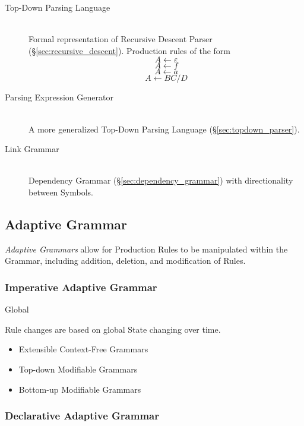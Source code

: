 \begin{description}
\item[Top-Down Parsing Language] \hfill \\
  Formal representation of Recursive Descent Parser
  (\S\ref{sec:recursive_descent}). Production rules of the form
  \[
    A \leftarrow \varepsilon
  \]\[
    A \leftarrow f
  \]\[
    A \leftarrow a
  \]\[
    A \leftarrow BC/D
  \]
\item[Parsing Expression Generator] \hfill \\
  A more generalized Top-Down Parsing Language
  (\S\ref{sec:topdown_parser}).
\item[Link Grammar] \hfill \\
  Dependency Grammar (\S\ref{sec:dependency_grammar}) with
  directionality between Symbols.
\end{description}



\subsection{Adaptive Grammar}\label{sec:adaptive_grammar}

\emph{Adaptive Grammars} allow for Production Rules to be manipulated
within the Grammar, including addition, deletion, and modification of
Rules.



\subsubsection{Imperative Adaptive Grammar}
\label{sec:imperative_adaptive}

Global

Rule changes are based on global State changing over time.

\begin{itemize}
  \item Extensible Context-Free Grammars
  \item Top-down Modifiable Grammars
  \item Bottom-up Modifiable Grammars
\end{itemize}



\subsubsection{Declarative Adaptive Grammar}
\label{sec:declarative_adaptive}


